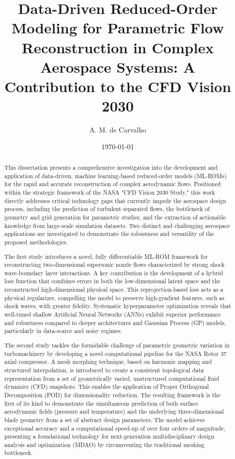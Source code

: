 \documentclass[12pt, a4paper]{report}
\begin{document}
\title{Data-Driven Reduced-Order Modeling for Parametric Flow Reconstruction in Complex Aerospace Systems: A Contribution to the CFD Vision 2030}
\author{A. M. de Carvalho}
\date{\today}
\maketitle

\begin{abstract}
This dissertation presents a comprehensive investigation into the development and application of data-driven, machine learning-based reduced-order models (ML-ROMs) for the rapid and accurate reconstruction of complex aerodynamic flows. Positioned within the strategic framework of the NASA "CFD Vision 2030 Study," this work directly addresses critical technology gaps that currently impede the aerospace design process, including the prediction of turbulent separated flows, the bottleneck of geometry and grid generation for parametric studies, and the extraction of actionable knowledge from large-scale simulation datasets. Two distinct and challenging aerospace applications are investigated to demonstrate the robustness and versatility of the proposed methodologies.

The first study introduces a novel, fully differentiable ML-ROM framework for reconstructing two-dimensional supersonic nozzle flows characterized by strong shock wave-boundary layer interactions. A key contribution is the development of a hybrid loss function that combines errors in both the low-dimensional latent space and the reconstructed high-dimensional physical space. This reprojection-based loss acts as a physical regularizer, compelling the model to preserve high-gradient features, such as shock waves, with greater fidelity. Systematic hyperparameter optimization reveals that well-tuned shallow Artificial Neural Networks (ANNs) exhibit superior performance and robustness compared to deeper architectures and Gaussian Process (GP) models, particularly in data-scarce and noisy regimes.

The second study tackles the formidable challenge of parametric geometric variation in turbomachinery by developing a novel computational pipeline for the NASA Rotor 37 axial compressor. A mesh morphing technique, based on harmonic mapping and structured interpolation, is introduced to create a consistent topological data representation from a set of geometrically varied, unstructured computational fluid dynamics (CFD) snapshots. This enables the application of Proper Orthogonal Decomposition (POD) for dimensionality reduction. The resulting framework is the first of its kind to demonstrate the simultaneous prediction of both surface aerodynamic fields (pressure and temperature) and the underlying three-dimensional blade geometry from a set of abstract design parameters. The model achieves exceptional accuracy and a computational speed-up of over four orders of magnitude, presenting a foundational technology for next-generation multidisciplinary design analysis and optimization (MDAO) by circumventing the traditional meshing bottleneck.


\end{abstract}
\end{document}
